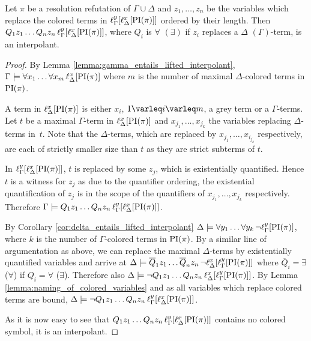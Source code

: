 \begin{thm}
	Let $\pi$ be a resolution refutation of $\Gamma \cup \Delta$ and
	$z_1, \dots, z_n$ be the variables which replace the colored terms in $\lifgamma{\lifdelta{\PI(\pi)}}$ ordered by their length.
	Then
	$Q_1 z_1 \ldots Q_n z_n\,\lifgamma{\lifdelta{\PI(\pi)}}$, where $Q_i$ is $\forall$ $(\exists)$ if $z_i$ replaces a $\Delta$ $(\Gamma)$-term, is an interpolant.
\end{thm}
\begin{proof}
	By Lemma \ref{lemma:gamma_entails_lifted_interpolant}, $\Gamma \entails \forall x_1 \ldots \forall x_m\,\lifdelta{\PI(\pi)}$ where $m$ is the number of maximal $\Delta$-colored terms in $\PI(\pi)$.

	A term in $\lifdelta{\PI(\pi)}$ is either $x_i$, $1 \varleq i \varleq m$, a grey term or a $\Gamma$-terms.
	Let $t$ be a maximal $\Gamma$-term in $\lifdelta{\PI(\pi)}$ and $x_{j_1}, \dots, x_{j_k}$ the variables replacing $\Delta$-terms in~$t$.
	Note that the $\Delta$-terms, which are replaced by $x_{j_1}, \ldots, x_{i_{j_k}}$ respectively, are each of strictly smaller size than $t$ as they are strict subterms of $t$.


	In $\lifgamma{\lifdelta{\PI(\pi)}}$, $t$ is replaced by some $z_j$, which is existentially quantified.
	Hence $t$ is a witness for $z_j$ as due to the quantifier ordering,
	the existential quantification of $z_j$ is in the scope of the quantifiers of $x_{j_1}, \ldots, x_{j_k}$ respectively.
	Therefore $\Gamma \entails Q_1 z_1 \ldots Q_n z_n\,\lifgamma{\lifdelta{\PI(\pi)}}$.

	By Corollary \ref{cor:delta_entails_lifted_interpolant} $\Delta \entails \forall y_1 \dots \forall y_k\,\lnot \lift{\Gamma}{\PI(\pi)}{y}$, where $k$ is the number of $\Gamma$-colored terms in $\PI(\pi)$.
	By a similar line of argumentation as above, we can replace the maximal $\Delta$-terms by existentially quantified variables and arrive at
	$\Delta \entails\nolinebreak{} \overline Q_1 z_1 \dots \overline Q_n z_n\,\lnot \lft{\Delta}{x}{\lft{\Gamma}{y}{\PI(\pi)}}$ where $\overline Q_i = \exists$ ($\forall$) if $Q_i = \forall$ ($\exists$).
	Therefore also
	$\Delta \entails\nolinebreak{} \lnot Q_1 z_1 \dots Q_n z_n\,\lft{\Delta}{x}{\lft{\Gamma}{y}{\PI(\pi)}}$.
	By Lemma \ref{lemma:naming_of_colored_variables} and as all variables which replace colored terms are bound, 
	$\Delta \entails\nolinebreak{} \lnot Q_1 z_1 \dots Q_n z_n\,\lft{\Gamma}{y}{\lft{\Delta}{x}{\PI(\pi)}}$.

	As it is now easy to see that $Q_1 z_1 \dots Q_n z_n\,\lft{\Gamma}{y}{\lft{\Delta}{x}{\PI(\pi)}}$ contains no colored symbol, it is an interpolant.
\end{proof}





